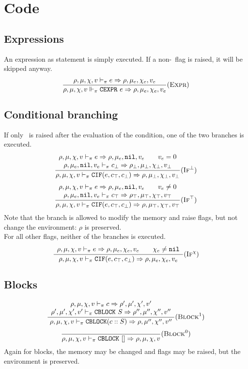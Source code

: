 \section{Code}
\subsection{Expressions}
An expression as statement is simply executed. If a non-\nil\ flag is raised, it will be skipped anyway.\\
\[\dfrac{
    \rho,\mu,\chi,v \vdash_\pi e \Rightarrow \rho,\mu_e,\chi_e,v_e
}{\rho,\mu,\chi,v \Vdash_\pi \texttt{CEXPR}\ e \Rightarrow \rho,\mu_e,\chi_e,v_e}(\textsc{Expr})\]

\subsection{Conditional branching}
If only \nil\ is raised after the evaluation of the condition, one of the two branches is executed.
\[\dfrac{\begin{array}{c}
    \rho,\mu,\chi,v \vdash_\pi e \Rightarrow \rho,\mu_e,\texttt{nil},v_e \qquad v_e = 0 \\
    \rho,\mu_e,\texttt{nil},v_e \vdash_\pi c_\bot \Rightarrow \rho_\bot,\mu_\bot,\chi_\bot,v_\bot \\
\end{array}}{\rho,\mu,\chi,v \vdash_\pi \texttt{CIF}(e, c_\top, c_\bot) \Rightarrow \rho,\mu_\bot,\chi_\bot,v_\bot} (\textsc{If}^\bot)\]
\[\dfrac{\begin{array}{c}
    \rho,\mu,\chi,v \vdash_\pi e \Rightarrow \rho,\mu_e,\texttt{nil},v_e \qquad v_e \ne 0 \\
    \rho,\mu_e,\texttt{nil},v_e \vdash_\pi c_\top \Rightarrow \rho_\top,\mu_\top,\chi_\top,v_\top \\
\end{array}}{\rho,\mu,\chi,v \vdash_\pi \texttt{CIF}(e, c_\top, c_\bot) \Rightarrow \rho,\mu_\top,\chi_\top,v_\top} (\textsc{If}^\top)\]
Note that the branch is allowed to modify the memory and raise flags, but not change the environment: \(\rho\) is preserved.\\

For all other flags, neither of the branches is executed.
\[\dfrac{\begin{array}{c}
\rho,\mu,\chi,v \vdash_\pi e \Rightarrow \rho,\mu_e,\chi_e,v_e \qquad \chi_e\ne\texttt{nil} \\
\end{array}}{\rho,\mu,\chi,v \vdash_\pi \texttt{CIF}(e, c_\top, c_\bot) \Rightarrow \rho,\mu_e,\chi_e,v_e} (\textsc{If}^\chi)\]

\subsection{Blocks}
\[\dfrac{\begin{array}{c}
    \rho,\mu,\chi,v \vdash_\pi c \Rightarrow \rho',\mu',\chi',v' \\
    \rho',\mu',\chi',v' \vdash_\pi \texttt{CBLOCK}\ S \Rightarrow \rho'',\mu'',\chi'',v''
\end{array}}{\rho,\mu,\chi,v \vdash_\pi \texttt{CBLOCK}(c :: S) \Rightarrow \rho,\mu'',\chi'',v''} (\textsc{Block}^1)\]
\[\dfrac{}{\rho,\mu,\chi,v \vdash_\pi \texttt{CBLOCK}\ [] \Rightarrow \rho,\mu,\chi,v} (\textsc{Block}^0)\]
Again for blocks, the memory may be changed and flags may be raised, but the environment is preserved.\\


